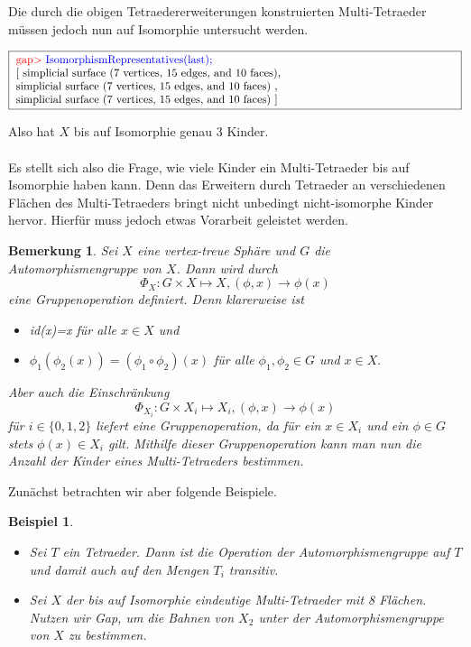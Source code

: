 \documentclass[12pt,titlepage,twoside,cleardoublepage]{article}
\theoremstyle{nummermitklammern}
\newtheorem{bsp}[temp]{Beispiel}
\newtheorem{bemerkung}[temp]{Bemerkung}
\newtheorem{bsp}[zahl]{Beispiel}
\newtheorem{bemerkung}[zahl]{Bemerkung}
\numberwithin{equation}{section}
\begin{document}
 Die durch die obigen Tetraedererweiterungen konstruierten Multi-Tetraeder müssen jedoch nun auf Isomorphie untersucht werden.
 \begin{center} 
 $\fbox{
\parbox{14cm}{
\textcolor{red}{gap$>$} \textcolor{blue}{IsomorphismRepresentatives(last);}\newline
[ simplicial surface (7 vertices, 15 edges, and 10 faces),\newline
 simplicial surface (7 vertices, 15 edges, and 10 faces)
    ,
    \newline
  simplicial surface (7 vertices, 15 edges, and 10 faces)
 ]
}}$
\end{center}
Also hat $X$ bis auf Isomorphie genau 3 Kinder. \\\\
Es stellt sich also die Frage, wie viele Kinder ein Multi-Tetraeder bis auf Isomorphie haben kann. Denn das Erweitern durch Tetraeder an verschiedenen Flächen des Multi-Tetraeders bringt nicht unbedingt nicht-isomorphe Kinder hervor. Hierfür muss jedoch etwas Vorarbeit geleistet werden.
\begin{bemerkung} 
Sei $X$ eine vertex-treue Sphäre und $G$ die Automorphismengruppe von $X$. Dann wird durch 
\[
\Phi_X:G \times X\mapsto X,(\phi, x)\to \phi(x)
\] eine Gruppenoperation definiert. Denn klarerweise ist
\begin{itemize}
\item id(x)=x für alle $x\in X$ und
\item $\phi_1(\phi_2 (x))=(\phi_1 \circ\phi_2)(x)$ für alle $\phi_1,\phi_2 \in G$ und $x\in X.$
\end{itemize}
Aber auch die Einschränkung   
\[
\Phi_{X_i}:G \times X_i\mapsto X_i,(\phi, x)\to \phi(x)
\] für $i\in \{0,1,2\}$ liefert eine Gruppenoperation, da für ein $x\in X_i$ und ein $\phi\in G$ stets $\phi(x)\in X_i$ gilt. Mithilfe dieser Gruppenoperation kann man nun die Anzahl der Kinder eines Multi-Tetraeders bestimmen.
\end{bemerkung}
Zunächst betrachten wir aber folgende Beispiele. 
\begin{bsp}
\begin{itemize}
\item Sei $T$ ein Tetraeder. Dann ist die Operation der Automorphismengruppe auf $T$ und damit auch auf den Mengen $T_i$ transitiv.
\item Sei $X$ der bis auf Isomorphie eindeutige Multi-Tetraeder mit 8 Flächen. Nutzen wir Gap, um die Bahnen von $X_2$ unter der Automorphismengruppe von $X$ zu bestimmen.
\end{itemize}
\end{bsp}
\end{document}
